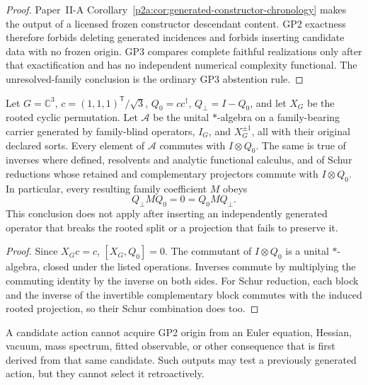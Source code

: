 \documentclass[12pt,a4paper]{article}
\begin{document}
\begin{proof}
Paper~II-A Corollary~\ref{p2a:cor:generated-constructor-chronology} makes the
output of a licensed frozen constructor descendant content.  GP2 exactness
therefore forbids deleting generated incidences and forbids inserting
candidate data with no frozen origin.  GP3 compares complete faithful
realizations only after that exactification and has no independent numerical
complexity functional.  The unresolved-family conclusion is the ordinary GP3
abstention rule.
\end{proof}

\begin{proposition}
\label{p3a:prop:rooted-c3-split-preserving-closure}
Let $G=\mathbb C^3$, $c=(1,1,1)^{\mathsf T}/\sqrt3$,
$Q_0=cc^\dagger$, $Q_\perp=I-Q_0$, and let $X_G$ be the rooted
cyclic permutation.  Let $\mathscr A$ be the unital $*$-algebra
on a family-bearing carrier generated by family-blind operators,
$I_G$, and $X_G^{\pm1}$, all with their original declared sorts.
Every element of $\mathscr A$ commutes with $I\otimes Q_0$.
The same is true of inverses where defined, resolvents and analytic
functional calculus, and of Schur reductions whose retained and
complementary projectors commute with $I\otimes Q_0$.
In particular, every resulting family coefficient $M$ obeys
\[
 Q_\perp M Q_0=0=Q_0 M Q_\perp.
\]
This conclusion does not apply after inserting an independently generated
operator that breaks the rooted split or a projection that fails to
preserve it.
\end{proposition}
\begin{proof}
Since $X_Gc=c$, $[X_G,Q_0]=0$.  The commutant of
$I\otimes Q_0$ is a unital $*$-algebra, closed under the
listed operations. Inverses commute by multiplying the commuting
identity by the inverse on both sides. For Schur reduction, each
block and the inverse of the invertible complementary block
commutes with the induced rooted projection, so their Schur
combination does too.
\end{proof}


\begin{corollary}
\label{p3a:cor:preaction-no-self-witness}
A candidate action cannot acquire GP2 origin from an Euler equation, Hessian,
vacuum, mass spectrum, fitted observable, or other consequence that is first
derived from that same candidate.  Such outputs may test a previously
generated action, but they cannot select it retroactively.
\end{corollary}
\end{document}

